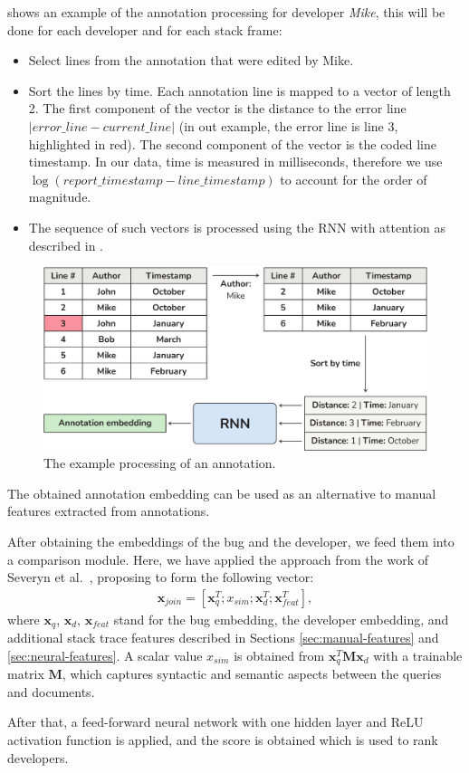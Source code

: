  shows an example of the annotation processing for developer \textit{Mike}, this will be done for each developer and for each stack frame: 

\begin{itemize}
    \item Select lines from the annotation that were edited by Mike.
    \item Sort the lines by time. Each annotation line is mapped to a vector of length 2. The first component of the vector is the distance to the error line $|error\_line - current\_line|$ (in out example, the error line is line 3, highlighted in red). The second component of the vector is the coded line timestamp. In our data, time is measured in milliseconds, therefore we use $\log{(report\_timestamp - line\_timestamp)}$ to account for the order of magnitude.
    \item The sequence of such vectors is processed using the RNN with attention as described in . 
\end{itemize}

\begin{figure}[t]
    \centering
    \includegraphics[width=\columnwidth]{figures/03-approach/annotation-embedding.pdf}
    \centering
    \caption{The example processing of an annotation.}
    \label{fig:approach-annotation-embedding}
\end{figure}

The obtained annotation embedding can be used as an alternative to manual features extracted from annotations. 

\label{sec:vector-similarity}
After obtaining the embeddings of the bug and the developer, we feed them into a comparison module. Here, we have applied the approach from the work of Severyn et al.~\cite{Severyn2015LearningTR}, proposing to form the following vector:
\begin{align}
    \mathbf{x}_{join} = [ \mathbf{x}^T_q; x_{sim}; \mathbf{x}^T_d; \mathbf{x}^T_{feat} ],
\end{align}
where $\mathbf{x}_q$, $\mathbf{x}_d$, $\mathbf{x}_{feat}$ stand for the bug embedding, the developer embedding, and additional stack trace features described in Sections \ref{sec:manual-features} and \ref{sec:neural-features}. A scalar value $x_{sim}$ is obtained from $\mathbf{x}^T_q \mathbf{M} \mathbf{x}_d$ with a trainable matrix $\mathbf{M}$, which captures syntactic and semantic aspects between the queries and documents. 

After that, a feed-forward neural network with one hidden layer and ReLU activation function is applied, and the score is obtained which is used to rank developers. 